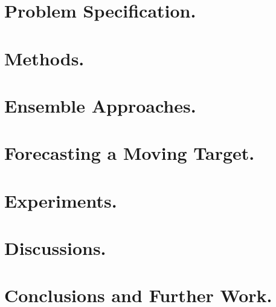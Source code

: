 \documentclass[twoside,leqno,twocolumn]{article}
\begin{document}
\section{Problem Specification.}

 
\section{Methods.}


\section{Ensemble Approaches.}


\section{Forecasting a Moving Target.}


\section{Experiments.}


\section{Discussions.}


\section{Conclusions and Further Work.}












\end{document}
